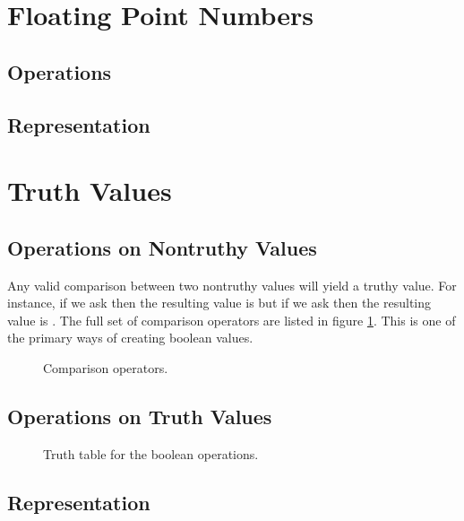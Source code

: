 \section{Floating Point Numbers}
\label{primitives:float}

\subsection{Operations}
\subsection{Representation}
\csharpsubsection{\csharp}

\section{Truth Values}
\label{primitives:bools}


\subsection{Operations on Nontruthy Values}

Any valid comparison between two nontruthy values will yield a truthy value. For instance, if we ask  then the resulting value is  but if we ask  then the resulting value is . The full set of comparison operators are listed in figure \ref{fig:prim:bool:comparison}. This is one of the primary ways of creating boolean values.

\begin{figure}[tbp]
  
  \caption{Comparison operators.}
  \label{fig:prim:bool:comparison}
\end{figure}

\subsection{Operations on Truth Values}

\begin{figure}[tbp]
  
  \caption{Truth table for the boolean operations.}
  \label{fig:prim:bool:and}
\end{figure}


\subsection{Representation}

